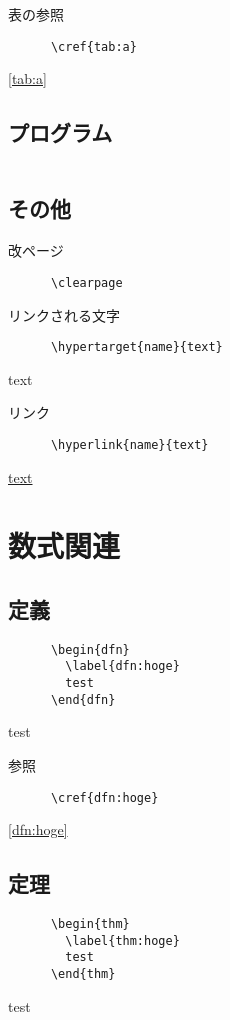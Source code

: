 \documentclass[uplatex, 11pt, a4j, dvipdfmx]{jsarticle}
\begin{document}
    表の参照
    \begin{verbatim}
      \cref{tab:a}
    \end{verbatim}
    \cref{tab:a}


  \subsection{プログラム}
    \begin{verbatim}
    \end{verbatim}


  \subsection{その他}
    改ページ
    \begin{verbatim}
      \clearpage
    \end{verbatim}
    \clearpage

    リンクされる文字
    \begin{verbatim}
      \hypertarget{name}{text}
    \end{verbatim}
    \hypertarget{name}{text}

    リンク
    \begin{verbatim}
      \hyperlink{name}{text}
    \end{verbatim}
    \hyperlink{name}{text}


\section{数式関連}
  \subsection{定義}
    \begin{verbatim}
      \begin{dfn}
        \label{dfn:hoge}
        test
      \end{dfn}
    \end{verbatim}
    \begin{screen}
      \begin{dfn}
        \label{dfn:hoge}
        test
      \end{dfn}
    \end{screen}

    参照
    \begin{verbatim}
      \cref{dfn:hoge}
    \end{verbatim}
    \cref{dfn:hoge}

  \subsection{定理}
    \begin{verbatim}
      \begin{thm}
        \label{thm:hoge}
        test
      \end{thm}
    \end{verbatim}
    \begin{thm}
      \label{thm:hoge}
      test
    \end{thm}
\end{document}
